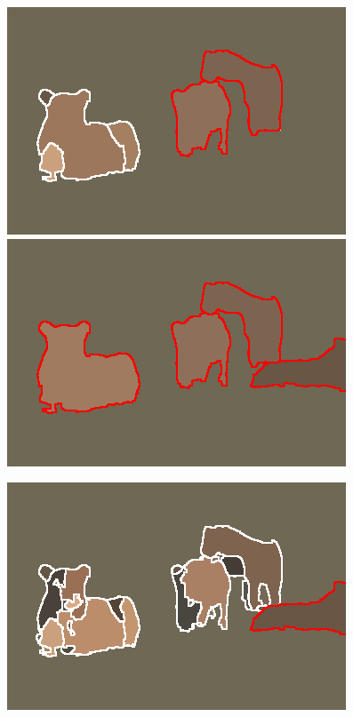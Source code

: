 \begin{figure}
\begin{center}
\begin{minipage}{0.24\linewidth}
\end{minipage}
\begin{minipage}{0.24\linewidth}
\includegraphics[width=\linewidth]{scale-aware/fig/aligned_lions/mcg_mid.png}\\[1mm]
\includegraphics[width=\linewidth]{scale-aware/fig/aligned_lions/mcg_our_good.png}
\end{minipage}
\begin{minipage}{0.24\linewidth}
\includegraphics[width=\linewidth]{scale-aware/fig/aligned_lions/mcg_overseg.png}\\[1mm]

\end{minipage}
\end{center}
\end{figure}
